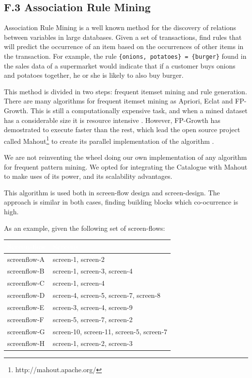 \documentclass{fast_latex}
\begin{document}
\subsection*{F.3 Association Rule Mining}

Association Rule Mining is a well known method for the discovery of relations between variables in large databases. Given a set of transactions, find rules that will predict the occurrence of an item based on the occurrences of other items in the transaction. For example, the rule \verb|{onions, potatoes} = {burger}| found in the sales data of a supermarket would indicate that if a customer buys onions and potatoes together, he or she is likely to also buy burger. 

This method is divided in two steps: frequent itemset mining and rule generation. There are many algorithms for frequent itemset mining as Apriori, Eclat and FP-Growth. This is still a computationally expensive task, and when a mined dataset has a considerable size it is resource intensive \cite{Han:2000:MFP:335191.335372}. However, FP-Growth has demostrated to execute faster than the rest, which lead the open source project called Mahout\footnote{http://mahout.apache.org/} to create its parallel implementation of the algorithm \cite{Li:2008:PPF:1454008.1454027}.

We are not reinventing the wheel doing our own implementation of any algorithm for frequent pattern mining. We opted for integrating the Catalogue with Mahout to make uses of its power, and its scalability advantages.

This algorithm is used both in screen-flow design and screen-design. The approach is similar in both cases, finding building blocks which co-ocurrence is high.

As an example, given the following set of screen-flows:

\begin{table}[h]
\begin{center}
\begin{tabular}{|p{3.5cm}|p{10cm}|}
\hline
\rowcolor{fast@lightgrey}\textcolor{white}{Screen-flow} &
                         \textcolor{white}{Screens} \\ \hline
screenflow-A & screen-1, screen-2 \\ \hline
screenflow-B & screen-1, screen-3, screen-4 \\ \hline
screenflow-C & screen-1, screen-4 \\ \hline
screenflow-D & screen-4, screen-5, screen-7, screen-8 \\ \hline
screenflow-E & screen-3, screen-4, screen-9 \\ \hline
screenflow-F & screen-5, screen-7, screen-2 \\ \hline
screenflow-G & screen-10, screen-11, screen-5, screen-7 \\ \hline
screenflow-H & screen-1, screen-2, screen-3 \\ \hline
\end{tabular}
\end{center}
\end{table}
\end{document}
